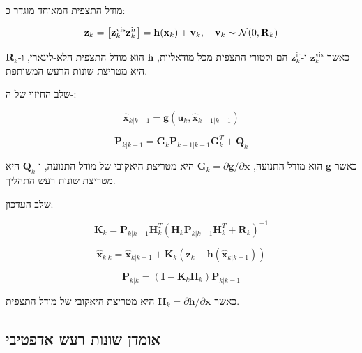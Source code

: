 מודל התצפית המאוחד מוגדר כ:

\begin{equation}
\mathbf{z}_k = \left[\mathbf{z}_k^{\text{vis}} \\ \mathbf{z}_k^{\text{ir}}\right] = \mathbf{h}(\mathbf{x}_k) + \mathbf{v}_k, \quad \mathbf{v}_k \sim \mathcal{N}(0, \mathbf{R}_k)
\label{eq:ch05_observation_model}
\end{equation}

כאשר $\mathbf{z}_k^{\text{vis}}$ ו-$\mathbf{z}_k^{\text{ir}}$ הם וקטורי התצפית מכל מודאליות, $\mathbf{h}$ הוא מודל התצפית הלא-לינארי, ו-$\mathbf{R}_k$ היא מטריצת שונות הרעש המשותפת.

שלב החיזוי של ה-:

\begin{equation}
\hat{\mathbf{x}}_{k|k-1} = \mathbf{g}(\mathbf{u}_k, \hat{\mathbf{x}}_{k-1|k-1})
\label{eq:ch05_ekf_predict}
\end{equation}

\begin{equation}
\mathbf{P}_{k|k-1} = \mathbf{G}_k \mathbf{P}_{k-1|k-1} \mathbf{G}_k^T + \mathbf{Q}_k
\label{eq:ch05_ekf_cov_predict}
\end{equation}

כאשר $\mathbf{g}$ הוא מודל התנועה, $\mathbf{G}_k = \partial \mathbf{g}/\partial \mathbf{x}$ היא מטריצת היאקובי של מודל התנועה, ו-$\mathbf{Q}_k$ היא מטריצת שונות רעש התהליך.

שלב העדכון:

\begin{equation}
\mathbf{K}_k = \mathbf{P}_{k|k-1} \mathbf{H}_k^T (\mathbf{H}_k \mathbf{P}_{k|k-1} \mathbf{H}_k^T + \mathbf{R}_k)^{-1}
\label{eq:ch05_kalman_gain}
\end{equation}

\begin{equation}
\hat{\mathbf{x}}_{k|k} = \hat{\mathbf{x}}_{k|k-1} + \mathbf{K}_k (\mathbf{z}_k - \mathbf{h}(\hat{\mathbf{x}}_{k|k-1}))
\label{eq:ch05_state_update}
\end{equation}

\begin{equation}
\mathbf{P}_{k|k} = (\mathbf{I} - \mathbf{K}_k \mathbf{H}_k) \mathbf{P}_{k|k-1}
\label{eq:ch05_cov_update}
\end{equation}

כאשר $\mathbf{H}_k = \partial \mathbf{h}/\partial \mathbf{x}$ היא מטריצת היאקובי של מודל התצפית.

\subsection{אומדן שונות רעש אדפטיבי}
\label{sec:ch05_adaptive_noise}

